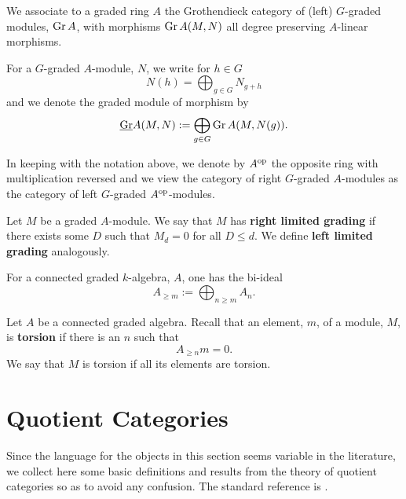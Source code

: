\begin{definition}
  We associate to a graded ring \(A\) the Grothendieck category of (left) \(G\)-graded modules, \(\operatorname{Gr}A\), with morphisms \(\operatorname{Gr}A(M,N)\) all degree preserving \(A\)-linear morphisms.

  For a \(G\)-graded \(A\)-module, \(N\), we write for \(h \in G\)
  \[N(h) = \bigoplus_{g \in G} N_{g + h}\]
  and we denote the graded module of morphism by
  \[\underline{\operatorname{Gr}}A(M,N) := \bigoplus_{g \in G} \operatorname{Gr}A(M,N(g)).\]
\end{definition}

\begin{remark}
  In keeping with the notation above, we denote by \(A^{\operatorname{op}}\) the opposite ring with multiplication reversed and we view the category of right \(G\)-graded \(A\)-modules as the category of left \(G\)-graded \(A^{\operatorname{op}}\)-modules.
\end{remark}

\begin{definition}
  Let \(M\) be a graded \(A\)-module. We say that \(M\) has \textbf{right limited grading} if there exists some \(D\) such that \(M_{d} = 0\) for all \(D \leq d\). We define \textbf{left limited grading} analogously.
\end{definition}

For a connected graded \(k\)-algebra, \(A\), one has the bi-ideal
\begin{displaymath}
  A_{\geq m} :=  \bigoplus_{n\geq m} A_n.
\end{displaymath}

\begin{definition}
  Let \(A\) be a connected graded algebra. Recall that an element, \(m\), of a module, \(M\), is \textbf{torsion} if there is an \(n\) such that
  \begin{displaymath}
    A_{\geq n} m = 0.
  \end{displaymath}
  We say that \(M\) is torsion if all its elements are torsion.
\end{definition}

\section{Quotient Categories}

Since the language for the objects in this section seems variable in the literature, we collect here some basic definitions and results from the theory of quotient categories so as to avoid any confusion.
The standard reference is \parencite{DCA62}.

